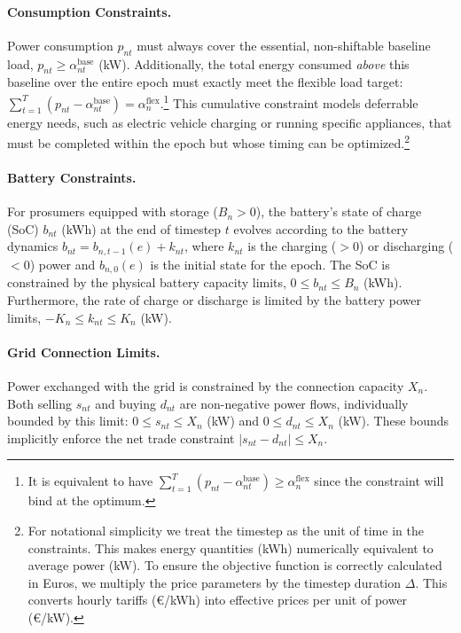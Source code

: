 \documentclass[12pt, notitlepage]{article}
\begin{document}
\paragraph{Consumption Constraints.}
Power consumption $p_{nt}$ must always cover the essential, non-shiftable baseline load, $p_{nt} \ge \alpha^{\text{base}}_{nt}$ (kW). Additionally, the total energy consumed \textit{above} this baseline over the entire epoch must exactly meet the flexible load target: $\sum_{t=1}^{T} (p_{nt} - \alpha^{\text{base}}_{nt}) = \alpha^{\text{flex}}_{n}$.\footnote{It is  equivalent to have $\sum_{t=1}^{T} (p_{nt} - \alpha^{\text{base}}_{nt}) \geq \alpha^{\text{flex}}_{n}$ since the constraint will bind at the optimum.} This cumulative constraint models deferrable energy needs, such as electric vehicle charging or running specific appliances, that must be completed within the epoch but whose timing can be optimized.\footnote{For notational simplicity we treat the timestep as the unit of time in the constraints. This makes energy quantities (kWh) numerically equivalent to average power (kW). To ensure the objective function is correctly calculated in Euros,  we multiply the price parameters by the timestep duration $\Delta$. This converts hourly tariffs (€/kWh) into effective prices per unit of power (€/kW).} 

\paragraph{Battery Constraints.}
For prosumers equipped with storage ($B_n > 0$), the battery's state of charge (SoC) $b_{nt}$ (kWh) at the end of timestep $t$ evolves according to the battery dynamics $b_{nt} = b_{n,t-1}(e) + k_{nt}$, where $k_{nt}$ is the charging ($>0$) or discharging ($<0$) power and $b_{n,0}(e)$ is the initial state for the epoch. The SoC is constrained by the physical battery capacity limits, $0 \le b_{nt} \le B_n$ (kWh). Furthermore, the rate of charge or discharge is limited by the battery power limits, $-K_n \le k_{nt} \le K_n$ (kW).

\paragraph{Grid Connection Limits.}
Power exchanged with the grid is constrained by the connection capacity $X_n$. Both selling $s_{nt}$ and buying $d_{nt}$ are non-negative power flows, individually bounded by this limit: $0 \le s_{nt} \le X_n$ (kW) and $0 \le d_{nt} \le X_n$ (kW). These bounds implicitly enforce the net trade constraint $|s_{nt} - d_{nt}| \le X_n$.
\end{document}
